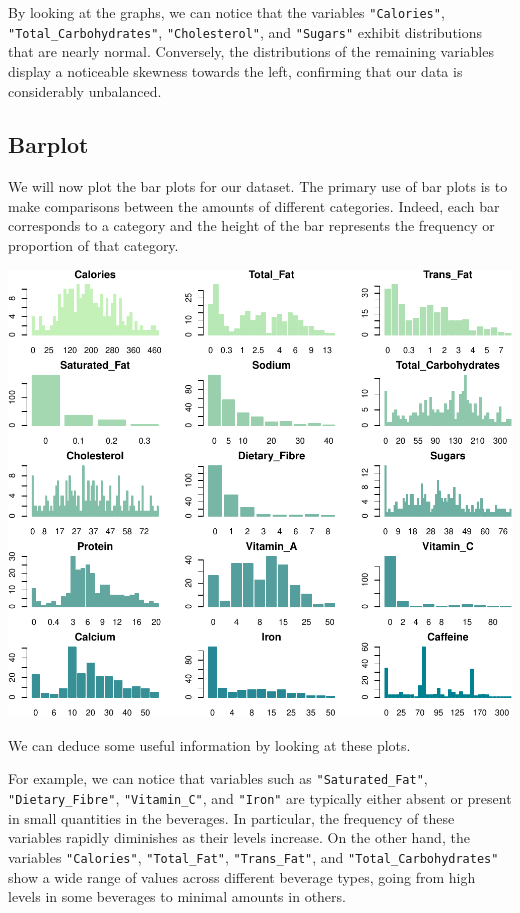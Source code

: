 \documentclass[
]{article}
\begin{document}
By looking at the graphs, we can notice that the variables
\texttt{"Calories"}, \texttt{"Total\_Carbohydrates"},
\texttt{"Cholesterol"}, and \texttt{"Sugars"} exhibit distributions that
are nearly normal. Conversely, the distributions of the remaining
variables display a noticeable skewness towards the left, confirming
that our data is considerably unbalanced.

\subsection{Barplot}\label{barplot}

We will now plot the bar plots for our dataset. The primary use of bar
plots is to make comparisons between the amounts of different
categories. Indeed, each bar corresponds to a category and the height of
the bar represents the frequency or proportion of that category.

\begin{center}\includegraphics{Statistical_Learning_Final_Report_files/figure-latex/barplot-1} \end{center}

We can deduce some useful information by looking at these plots.

For example, we can notice that variables such as
\texttt{"Saturated\_Fat"}, \texttt{"Dietary\_Fibre"},
\texttt{"Vitamin\_C"}, and \texttt{"Iron"} are typically either absent
or present in small quantities in the beverages. In particular, the
frequency of these variables rapidly diminishes as their levels
increase. On the other hand, the variables \texttt{"Calories"},
\texttt{"Total\_Fat"}, \texttt{"Trans\_Fat"}, and
\texttt{"Total\_Carbohydrates"} show a wide range of values across
different beverage types, going from high levels in some beverages to
minimal amounts in others.
\end{document}
